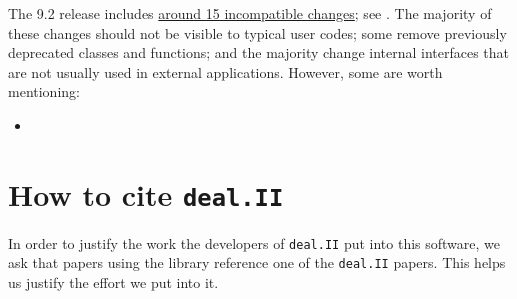 \documentclass{ansarticle-preprint}
\newcommand{\specialword}[1]{\texttt{#1}}
\newcommand{\dealii}{{\specialword{deal.II}}\xspace}
\begin{document}
The 9.2 release includes
\href{https://dealii.org/developer/doxygen/deal.II/changes_between_9_1_1_and_9_2_0.html}
     {around 15 incompatible changes}; see \cite{changes92}. The majority of these changes
should not be visible to typical user codes; some remove previously
deprecated classes and functions; and the majority change internal
interfaces that are not usually used in external
applications. However, some are worth mentioning:
\begin{itemize}
\item
\end{itemize}



\section{How to cite \dealii}\label{sec:cite}

In order to justify the work the developers of \dealii put into this
software, we ask that papers using the library reference one of the
\dealii papers. This helps us justify the effort we put into it.
\end{document}
